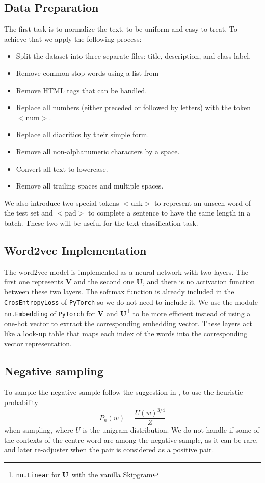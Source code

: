    \subsection{Data Preparation}
   The first task is to normalize the text, to be uniform and easy to treat. To achieve that we apply the following process:
   \begin{itemize}
	   \item Split the dataset into three separate files: title, description, and class label.
	   \item Remove common stop words using a list from \cite{stopwords}
	   \item Remove HTML tags that can be handled.
	   \item Replace all numbers (either preceded or followed by letters) with the token $<\mathrm{num}>$.
	   \item Replace all diacritics by their simple form.
	   \item Remove all non-alphanumeric characters by a space.
	   \item Convert all text to lowercase.
	   \item Remove all trailing spaces and multiple spaces.
   \end{itemize}
   We also introduce two special tokens $<\mathrm{unk}>$ to represent an unseen word of the test set and $<\mathrm{pad}>$ to complete a sentence to have the same length in a batch. These two will be useful for the text classification task.

   \subsection{Word2vec Implementation}
   The word2vec model is implemented as a neural network with two layers. The first one represents $\mathbf{V}$ and the second one $\mathbf{U}$, and there is no activation function between these two layers. The softmax function is already included in the \texttt{CrosEntropyLoss} of \texttt{PyTorch} so we do not need to include it.
   We use the module \texttt{nn.Embedding} of \texttt{PyTorch} for $\mathbf{V}$ and $\mathbf{U}$\footnote{\texttt{nn.Linear} for $\mathbf{U}$ with the vanilla Skipgram} to be more efficient instead of using a one-hot vector to extract the corresponding embedding vector. These layers act like a look-up table that maps each index of the words into the corresponding vector representation.

   \subsection{Negative sampling}
   To sample the negative sample follow the suggestion in \cite{sgns}, to use the heuristic probability
   \begin{equation}
	P_n(w) = \frac{U(w)^{3/4}}{Z}
   \end{equation}
   when sampling, where $U$ is the unigram distribution. We do not handle if some of the contexts of the centre word are among the negative sample, as it can be rare, and later re-adjuster when the pair is considered as a positive pair.

